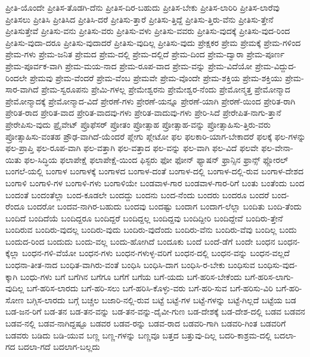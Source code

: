 {ಪ್ರೀತಿ-ಯೊಂದೇ
ಪ್ರೀತಿಸ-ತೊಡಗಿ-ದೆನು
ಪ್ರೀತಿಸ-ದಿರ-ಬಹುದು
ಪ್ರೀತಿಸ-ಬೇಕು
ಪ್ರೀತಿಸ-ಲಾರಿರಿ
ಪ್ರೀತಿಸ-ಲಾರೆವು
ಪ್ರೀತಿಸಲು
ಪ್ರೀತಿಸಿ
ಪ್ರೀತಿಸಿದ
ಪ್ರೀತಿಸಿ-ದರೆ
ಪ್ರೀತಿಸು-ತ್ತಾರೆ
ಪ್ರೀತಿಸು-ತ್ತಿದ್ದೆ
ಪ್ರೀತಿಸು-ತ್ತಿರು-ವೆನು
ಪ್ರೀತಿಸು-ತ್ತೇನೆ
ಪ್ರೀತಿಸುತ್ತೇವೆ
ಪ್ರೀತಿಸು-ವನು
ಪ್ರೀತಿಸು-ವರು
ಪ್ರೀತಿಸು-ವಳು
ಪ್ರೀತಿಸು-ವವರು
ಪ್ರೀತಿಸು-ವುದಕ್ಕೆ
ಪ್ರೀತಿಸು-ವುದ-ರಿಂದ
ಪ್ರೀತಿಸು-ವುದಾ-ದರೂ
ಪ್ರೀತಿಸು-ವುದಾದರೆ
ಪ್ರೀತಿಸು-ವುದಿಲ್ಲ
ಪ್ರೀತಿಸು-ವುದು
ಪ್ರೇಕ್ಷಕರ
ಪ್ರೇಮ
ಪ್ರೇಮಕ್ಕೆ
ಪ್ರೇಮ-ಗಳಿಂದ
ಪ್ರೇಮ-ಗಳು
ಪ್ರೇಮ-ಜನಿತ
ಪ್ರೇಮದ
ಪ್ರೇಮ-ದಲ್ಲಿ
ಪ್ರೇಮ-ದಲ್ಲಿದೆ
ಪ್ರೇಮ-ದಿಂದ
ಪ್ರೇಮ-ದ್ವಾರಾ
ಪ್ರೇಮ-ಪೂರ್ಣ
ಪ್ರೇಮ-ಪೂರ್ವಕ-ವಾಗಿ
ಪ್ರೇಮ-ಮಯ-ನಾದ
ಪ್ರೇಮ-ರೂಪ-ವಾದ
ಪ್ರೇಮ-ವನ್ನು
ಪ್ರೇಮ-ವಿದೆಯೋ
ಪ್ರೇಮ-ವಿದ್ದುದ-ರಿಂದಲೇ
ಪ್ರೇಮವು
ಪ್ರೇಮ-ವೆಂದರೆ
ಪ್ರೇಮ-ವೆಂಬ
ಪ್ರೇಮವೇ
ಪ್ರೇಮ-ವೊಂದೇ
ಪ್ರೇಮ-ಶಕ್ತಿಯ
ಪ್ರೇಮ-ಶಕ್ತಿಯು
ಪ್ರೇಮ-ಸಾರ-ವಾಗಿದೆ
ಪ್ರೇಮ-ಸ್ವರೂಪನು
ಪ್ರೇಮಿ-ಗಳಲ್ಲ
ಪ್ರೇಮೇಶ್ವರನು
ಪ್ರೇಮೇಶ್ವರ-ನೆಂದು
ಪ್ರೇಮೋನ್ಮತ್ತ
ಪ್ರೇಮೋನ್ಮಾದ
ಪ್ರೇಮೋನ್ಮಾದಕ್ಕೆ
ಪ್ರೇಮೋನ್ಮಾದ-ವಿದೆ
ಪ್ರೇರಣೆ-ಗಳು
ಪ್ರೇರಣೆ-ಯನ್ನೂ
ಪ್ರೇರಣೆ-ಯಾಗಿ
ಪ್ರೇರಣೆ-ಯಿಂದ
ಪ್ರೇರಿತ-ರಾಗಿ
ಪ್ರೇರಿತ-ರಾದ
ಪ್ರೇರಿತ-ವಾದ
ಪ್ರೇರಿತ-ವಾದವು-ಗಳು
ಪ್ರೇರಿತ-ವಾದುವು-ಗಳು
ಪ್ರೇರಿ-ಸಿದೆ
ಪ್ರೇರೇಪಿತ-ನಾಗು-ತ್ತಾನೆ
ಪ್ರೇರೇಪಿಸು-ವುದು
ಪ್ರೈವೇಟ್
ಪ್ರೊಫೆಸರ್
ಪ್ರೋತಂ
ಪ್ರೋತ್ಸಾಹ
ಪ್ರೋತ್ಸಾಹ-ವನ್ನು
ಪ್ರೋತ್ಸಾಹಿಸು-ತ್ತಿರು-ವರು
ಪ್ರೋತ್ಸಾಹಿಸು-ವಂತಹ
ಪ್ರೌಢ-ವಾಗಿದೆ-ಯೆಂದರೆ
ಪ್ಲೇಗು
ಪ್ಲೇಟೋ
ಫಲ
ಫಲಕಾರಿ-ಯಾಗ-ಬೇಕಾದರೆ
ಫಲಕ್ಕೆ
ಫಲ-ಗಳನ್ನು
ಫಲ-ಪ್ರಾಪ್ತಿ
ಫಲ-ರೂಪ-ವಾಗಿ
ಫಲ-ವತ್ತಾಗಿ
ಫಲ-ವತ್ತಾದ
ಫಲ-ವನ್ನು
ಫಲ-ವಾಗಿ
ಫಲ-ವಿದೆ
ಫಲವೇ
ಫಲ-ವೇನಾ-ಯಿತು
ಫಲ-ಸಿದ್ಧಿಯ
ಫಲಾಪೇಕ್ಷೆ
ಫಲಾಪೇಕ್ಷೆ-ಯಿಂದ
ಫಿಸ್ಟರು
ಫೋ
ಫೋನ್
ಫ್ಯಾಷನ್
ಫ್ರಾನ್ಸಿನ
ಫ್ರಾನ್ಸ್
ಫ್ಲೋರಲ್
ಬಂಗಲೆ-ಯಲ್ಲಿ
ಬಂಗಾಳ
ಬಂಗಾಳಕ್ಕೆ
ಬಂಗಾಳದ
ಬಂಗಾಳ-ದಂತೆ
ಬಂಗಾಳ-ದಲ್ಲಿ
ಬಂಗಾಳ-ದಲ್ಲಿ-ರುವ
ಬಂಗಾಳ-ದೇಶದ
ಬಂಗಾಳಿ
ಬಂಗಾಳಿ-ಗಳ
ಬಂಗಾಳಿ-ಗಳು
ಬಂಗಾಳಿಯೇ
ಬಂಡವಾಳ-ಗಾರ
ಬಂಡವಾಳ-ಗಾರ-ರಿಗೆ
ಬಂತು
ಬಂತೆಂದು
ಬಂದ
ಬಂದಂತೆ
ಬಂದಂತೆಲ್ಲಾ
ಬಂದ-ಕೂಡಲೇ
ಬಂದದ್ದು
ಬಂದನು
ಬಂದ-ನೆಂದು
ಬಂದರು
ಬಂದರೂ
ಬಂದರೆ
ಬಂದ-ರೆಂದೂ
ಬಂದರೋ
ಬಂದವ-ನಾಗಿರ-ಬಹುದು
ಬಂದವು
ಬಂದಷ್ಟು
ಬಂದಾಗ
ಬಂದಾಗ-ಲೆಲ್ಲಾ
ಬಂದಿತು
ಬಂದಿ-ತೆಂದು
ಬಂದಿದೆ
ಬಂದಿದೆಯೆ
ಬಂದಿದ್ದರೂ
ಬಂದಿದ್ದರೆ
ಬಂದಿದ್ದಲ್ಲ
ಬಂದಿದ್ದವು
ಬಂದಿದ್ದೀರಿ
ಬಂದಿದ್ದೇವೆ
ಬಂದಿರು-ತ್ತೇನೆ
ಬಂದಿರುವ
ಬಂದಿರು-ವುದಲ್ಲ
ಬಂದಿರು-ವುದು
ಬಂದಿರು-ವುದೆಂದು
ಬಂದಿರು-ವೆನು
ಬಂದಿರು-ವೆವು
ಬಂದಿಲ್ಲ
ಬಂದು
ಬಂದುದ-ರಿಂದ
ಬಂದುದು
ಬಂದು-ವಲ್ಲ
ಬಂದು-ಹೋಗಿದೆ
ಬಂದೂಕು
ಬಂದೆ
ಬಂದೆ-ಡೆಗೆ
ಬಂದೇ
ಬಂಧನ
ಬಂಧನ-ಕ್ಕೆಲ್ಲಾ
ಬಂಧನ-ಗಳಿ-ವೆಯೋ
ಬಂಧನ-ಗಳು
ಬಂಧನ-ಗಳುಳ್ಳ-ವರಿಗೆ
ಬಂಧನ-ದಲ್ಲಿ
ಬಂಧನ-ವನ್ನು
ಬಂಧನ-ವಲ್ಲದೆ
ಬಂಧನಾ-ತೀತ-ನಾದ
ಬಂಧಿತ-ವಾಗಿರು-ವಂತೆ
ಬಂಧಿಸಿ
ಬಂಧಿಸಿ-ದಾಗ
ಬಂಧಿಸಿ-ರ-ಬೇಕು
ಬಂಧಿಸುವ
ಬಂಧಿಸು-ವುದ-ಕ್ಕಾಗಿ
ಬಂಧು-ಗಳು
ಬಗೆ
ಬಗೆಗಿನ
ಬಗೆಗೂ
ಬಗೆಗೆ
ಬಗೆಯ
ಬಗೆ-ಯದು
ಬಗೆ-ಹರಿಸ-ಬೇಕೆಂದು
ಬಗೆ-ಹರಿಸ-ಲಾಗು-ವುದಿಲ್ಲ
ಬಗೆ-ಹರಿಸ-ಲಾರದು
ಬಗೆ-ಹರಿ-ಸಲು
ಬಗೆ-ಹರಿಸಿ-ಕೊಳ್ಳು-ವರು
ಬಗೆ-ಹರಿ-ಸುವ
ಬಗೆ-ಹರಿಸು-ವಿರಿ
ಬಗೆ-ಹರಿ-ಸೋಣ
ಬಗ್ಗಿಸ-ಲಾರದು
ಬಗ್ಗೆ
ಬಚ್ಚಲ
ಬಜಾರಿ-ನಲ್ಲಿ-ರುವ
ಬಟ್ಟೆ
ಬಟ್ಟೆ-ಗಳ
ಬಟ್ಟೆ-ಗಳನ್ನು
ಬಟ್ಟೆ-ಗಿಲ್ಲದೆ
ಬಟ್ಟೆಯ
ಬಡ
ಬಡ-ಜನ-ರಿಗೆ
ಬಡ-ತನ
ಬಡ-ತನ-ವನ್ನು
ಬಡ-ತನ-ವನ್ನು-ದೈವೀ-ಗುಣ
ಬಡ-ದೇಶಕ್ಕೆ
ಬಡ-ದೇಶ-ದಲ್ಲಿ
ಬಡವ
ಬಡವನ
ಬಡವ-ನಲ್ಲಿ
ಬಡವ-ನಾಗಿದ್ದಷ್ಟೂ
ಬಡವರ
ಬಡವ-ರನ್ನು
ಬಡವ-ರಾದ
ಬಡವರಿ-ಗಾಗಿ
ಬಡವರಿ-ಗಿಂತ
ಬಡವರಿಗೆ
ಬಡವರು
ಬಡಿದು
ಬಡಿ-ಯುವ
ಬಣ್ಣ
ಬಣ್ಣ-ಗಳನ್ನು
ಬಣ್ಣವೂ
ಬತ್ತದ
ಬತ್ತುವು-ದಿಲ್ಲ
ಬದರಿ-ಕಾಶ್ರಮ-ದಲ್ಲಿ
ಬದಲಾ-ಗದ
ಬದಲಾ-ಗದೆ
ಬದಲಾಗ-ಬಲ್ಲದು
}
